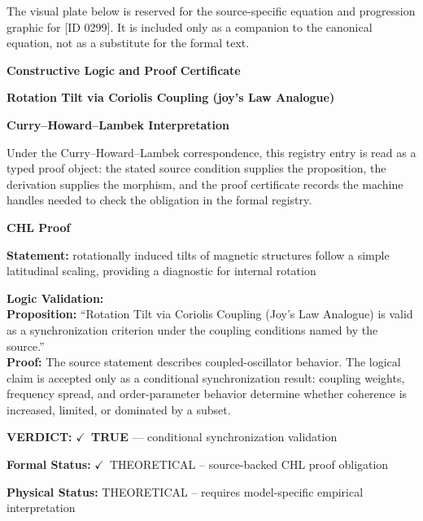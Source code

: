 \begingroup\footnotesize\sloppy
The visual plate below is reserved for the source-specific equation and progression graphic for [ID 0299]. It is included only as a companion to the canonical equation, not as a substitute for the formal text.
\par\endgroup
\ifTZPDarkEdition
{}
\fi

\clearpage
\begingroup\tzpsupportsetup
\noindent\textbf{\fontsize{10.8pt}{12.8pt}\selectfont [ID 0299] Constructive Logic and Proof Certificate}\par
\noindent\textbf{\fontsize{10pt}{12pt}\selectfont Rotation Tilt via Coriolis Coupling (joy's Law Analogue)}\par
\vspace{0.45em}
\begingroup
\footnotesize
\setlength{\parskip}{0.22em}
\setlength{\parindent}{0pt}
\noindent\textbf{Curry--Howard--Lambek Interpretation}\par
Under the Curry--Howard--Lambek correspondence, this registry entry is read as a typed proof
object: the stated source condition supplies the proposition, the derivation supplies the
morphism, and the proof certificate records the machine handles needed to check the obligation
in the formal registry.

\vspace{0.45em}
\noindent\textbf{CHL Proof}\par
\textbf{Statement:} rotationally induced tilts of magnetic structures follow a simple latitudinal scaling,
providing a diagnostic for internal rotation

\textbf{Logic Validation:}\\
\textbf{Proposition:} ``Rotation Tilt via Coriolis Coupling (Joy's Law Analogue) is valid as a synchronization
criterion under the coupling conditions named by the source.''\\
\textbf{Proof:} The source statement describes coupled-oscillator behavior. The logical claim is
accepted only as a conditional synchronization result: coupling weights, frequency
spread, and order-parameter behavior determine whether coherence is increased, limited,
or dominated by a subset.

\textbf{VERDICT:} \ensuremath{\checkmark}\ \textbf{TRUE} --- conditional synchronization validation

\textbf{Formal Status:} \ensuremath{\checkmark}\ THEORETICAL -- source-backed CHL proof obligation

\textbf{Physical Status:} THEORETICAL -- requires model-specific empirical interpretation
\par\vspace{0.45em}
\par
\ifTZPDarkEdition
{}
\fi
\endgroup
\endgroup
